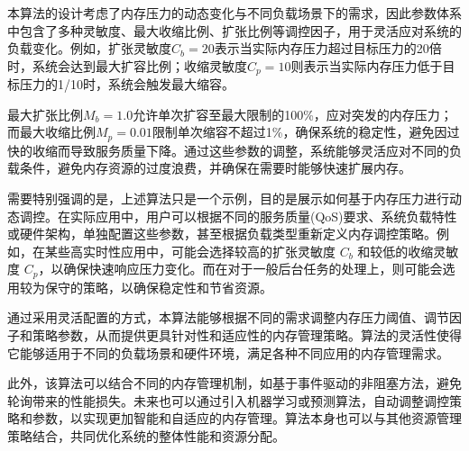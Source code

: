 本算法的设计考虑了内存压力的动态变化与不同负载场景下的需求，因此参数体系中包含了多种灵敏度、最大收缩比例、扩张比例等调控因子，用于灵活应对系统的负载变化。例如，扩张灵敏度\(C_b = 20\)表示当实际内存压力超过目标压力的20倍时，系统会达到最大扩容比例；收缩灵敏度\(C_p = 10\)则表示当实际内存压力低于目标压力的1/10时，系统会触发最大缩容。

最大扩张比例\(M_b = 1.0\)允许单次扩容至最大限制的100\%，应对突发的内存压力；而最大收缩比例\(M_p = 0.01\)限制单次缩容不超过1\%，确保系统的稳定性，避免因过快的收缩而导致服务质量下降。通过这些参数的调整，系统能够灵活应对不同的负载条件，避免内存资源的过度浪费，并确保在需要时能够快速扩展内存。


需要特别强调的是，上述算法只是一个示例，目的是展示如何基于内存压力进行动态调控。在实际应用中，用户可以根据不同的服务质量(QoS)要求、系统负载特性或硬件架构，单独配置这些参数，甚至根据负载类型重新定义内存调控策略。例如，在某些高实时性应用中，可能会选择较高的扩张灵敏度 \(C_b\) 和较低的收缩灵敏度 \(C_p\)，以确保快速响应压力变化。而在对于一般后台任务的处理上，则可能会选用较为保守的策略，以确保稳定性和节省资源。

通过采用灵活配置的方式，本算法能够根据不同的需求调整内存压力阈值、调节因子和策略参数，从而提供更具针对性和适应性的内存管理策略。算法的灵活性使得它能够适用于不同的负载场景和硬件环境，满足各种不同应用的内存管理需求。

此外，该算法可以结合不同的内存管理机制，如基于事件驱动的非阻塞方法，避免轮询带来的性能损失。未来也可以通过引入机器学习或预测算法，自动调整调控策略和参数，以实现更加智能和自适应的内存管理。算法本身也可以与其他资源管理策略结合，共同优化系统的整体性能和资源分配。





